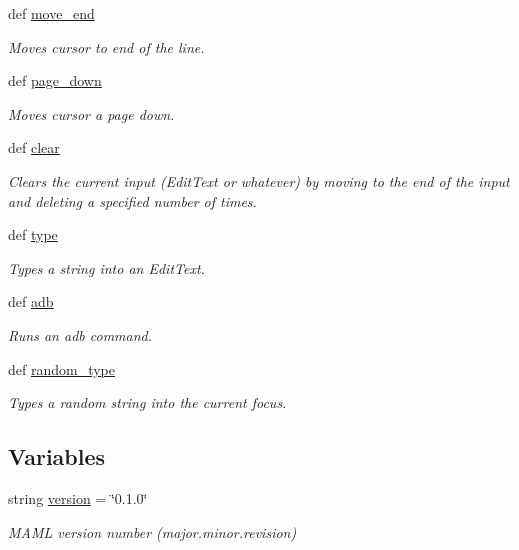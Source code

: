 \begin{DoxyCompactItemize}
def \hyperlink{namespacemaml_a0bf88e2d68a6454ddf0550c32a12a374}{move\_\-end}
\begin{DoxyCompactList}\small\item\em Moves cursor to end of the line. \item\end{DoxyCompactList}\item 
def \hyperlink{namespacemaml_ab9633425c18b3d6a0817e937c8b258a0}{page\_\-down}
\begin{DoxyCompactList}\small\item\em Moves cursor a page down. \item\end{DoxyCompactList}\item 
def \hyperlink{namespacemaml_aae54dc5214b125cde741a4650ddfb1b2}{clear}
\begin{DoxyCompactList}\small\item\em Clears the current input (EditText or whatever) by moving to the end of the input and deleting a specified number of times. \item\end{DoxyCompactList}\item 
def \hyperlink{namespacemaml_ab2bc5d522db8ba34ebb4731bd5b0250c}{type}
\begin{DoxyCompactList}\small\item\em Types a string into an EditText. \item\end{DoxyCompactList}\item 
def \hyperlink{namespacemaml_aa0ddce6133987501eb403331c909baed}{adb}
\begin{DoxyCompactList}\small\item\em Runs an adb command. \item\end{DoxyCompactList}\item 
def \hyperlink{namespacemaml_ad5c6274eebc7ceac8b74048ef4a92f27}{random\_\-type}
\begin{DoxyCompactList}\small\item\em Types a random string into the current focus. \item\end{DoxyCompactList}\end{DoxyCompactItemize}
\subsection*{Variables}
\begin{DoxyCompactItemize}
\item 
string \hyperlink{namespacemaml_a564d6a894fe9c44d132cda1a6979b773}{version} = \char`\"{}0.1.0\char`\"{}
\begin{DoxyCompactList}\small\item\em MAML version number (major.minor.revision) \item\end{DoxyCompactList}\end{DoxyCompactItemize}


